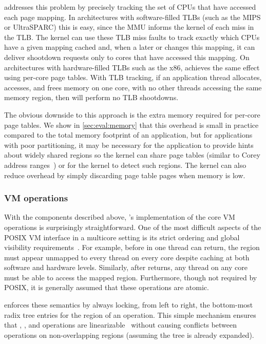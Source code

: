 \vm addresses this problem by precisely tracking the set of CPUs that
have accessed each page mapping.
%
In architectures with software-filled TLBs (such as the MIPS or
UltraSPARC) this is easy, since the MMU informs the kernel of each
miss in the TLB.  The kernel can use these TLB miss faults to track
exactly which CPUs have a given mapping cached and, when a later
 or  changes this mapping, it can deliver
shootdown requests
only to cores that have accessed this mapping.  On architectures
with hardware-filled TLBs such as the x86, \vm achieves the
same effect using per-core page tables.
%
With TLB tracking, if an application thread
allocates, accesses, and frees memory on one core, with no other threads
accessing the same memory region, then \vm will perform no TLB shootdowns.

The obvious downside to this approach is the extra memory required for
per-core page tables.  We show in \cref{sec:eval:memory} that this
overhead is small in practice compared to the total memory footprint
of an application, but for applications with poor partitioning, it may
be necessary for the application to provide hints about widely shared
regions so the kernel can share page tables (similar to Corey address
ranges~\cite{boyd-wickizer:corey}) or for the kernel to detect such
regions.
%
The kernel can also reduce overhead by simply discarding page table
pages when memory is low.

\subsubsection{VM operations}
\label{sec:radixvm:ops}

With the components described above, \vm's implementation of the core
VM operations is surprisingly straightforward.
%
One of the most difficult aspects of the POSIX VM interface in a
multicore setting is its strict ordering and global visibility
requirements~\cite{clements:bonsai}.
%
For example, before  in one thread can return, the region
must appear unmapped to every thread on every core despite caching at
both software and hardware levels.
%
Similarly, after  returns, any thread on any core
must be able to access the mapped region.  Furthermore, though not
required by POSIX, it is generally assumed that these operations are
atomic.

\vm enforces these semantics by always locking, from left to right,
the bottom-most radix tree entries for the region of an operation.
%
This simple mechanism ensures that , , and
 operations are
linearizable~\cite{herlihy:linearizability} without causing conflicts
between operations on non-overlapping regions (assuming the tree is
already expanded).

